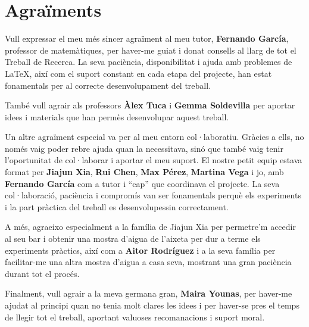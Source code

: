 \section*{Agraïments}

Vull expressar el meu més sincer agraïment al meu tutor, \textbf{Fernando García}, professor de matemàtiques, per haver-me guiat i donat consells al llarg de tot el Treball de Recerca. La seva paciència, disponibilitat i ajuda amb problemes de LaTeX, així com el suport constant en cada etapa del projecte, han estat fonamentals per al correcte desenvolupament del treball.

També vull agrair als professors \textbf{Àlex Tuca} i \textbf{Gemma Soldevilla} per aportar idees i materials que han permès desenvolupar aquest treball.

Un altre agraïment especial va per al meu entorn col·laboratiu. Gràcies a ells, no només vaig poder rebre ajuda quan la necessitava, sinó que també vaig tenir l’oportunitat de col·laborar i aportar el meu suport. El nostre petit equip estava format per \textbf{Jiajun Xia}, \textbf{Rui Chen}, \textbf{Max Pérez}, \textbf{Martina Vega} i jo, amb \textbf{Fernando García} com a tutor i “cap” que coordinava el projecte. La seva col·laboració, paciència i compromís van ser fonamentals perquè els experiments i la part pràctica del treball es desenvolupessin correctament.

A més, agraeixo especialment a la família de Jiajun Xia per permetre’m accedir al seu bar i obtenir una mostra d’aigua de l’aixeta per dur a terme els experiments pràctics, així com a \textbf{Aitor Rodríguez} i a la seva família per facilitar-me una altra mostra d’aigua a casa seva, mostrant una gran paciència durant tot el procés.

Finalment, vull agrair a la meva germana gran, \textbf{Maira Younas}, per haver-me ajudat al principi quan no tenia molt clares les idees i per haver-se pres el temps de llegir tot el treball, aportant valuoses recomanacions i suport moral.

